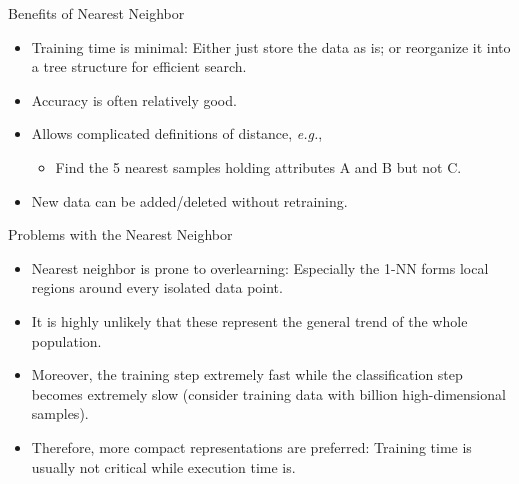 \documentclass[10pt, aspectratio=169]{beamer} %
\begin{document}
\begin{frame}{Benefits of Nearest Neighbor}
\begin{itemize}
\item Training time is minimal: Either just store the data as is; or reorganize it into a tree structure for efficient search.
\item Accuracy is often relatively good. 
\item Allows complicated definitions of distance, \textit{e.g.},
\begin{itemize}
\item Find the 5 nearest samples holding attributes A and B but not C.
\end{itemize}
\item New data can be added/deleted without retraining.
\end{itemize}
\end{frame}


\begin{frame}{Problems with the Nearest Neighbor}
\begin{itemize}
\item Nearest neighbor is prone to overlearning: Especially the 1-NN forms local
regions around every isolated data point. 
\item It is highly unlikely that these represent the general trend of the whole population.
\item Moreover, the training step extremely fast while the classification step becomes
extremely slow (consider training data with billion high-dimensional samples).
\item Therefore, more compact representations are preferred: Training time is
usually not critical while execution time is.
\end{itemize}
\end{frame}
\end{document}
